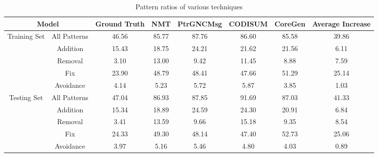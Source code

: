 \begin{table}[htbp]
\caption{Pattern ratios of various techniques}
\begin{tabular}{cc|cccccc}
\toprule
\multicolumn{2}{c|}{Model}&Ground Truth&NMT&PtrGNCMsg&CODISUM&CoreGen&Average Increase\\
\midrule
\multirow{5}{*}{Training Set}&All Patterns&46.56&85.77&87.76&86.60&85.58&39.86\\
~&Addition&15.43&18.75&24.21&21.62&21.56&6.11\\
~&Removal&3.10&13.00&9.42&11.45&8.88&7.59\\
~&Fix&23.90&48.79&48.41&47.66&51.29&25.14\\
~&Avoidance&4.14&5.23&5.72&5.87&3.85&1.03\\
\midrule
\multirow{5}{*}{Testing Set}&All Patterns&47.04&86.93&87.85&91.69&87.03&41.33\\
~&Addition&15.34&18.89&24.59&24.30&20.91&6.84\\
~&Removal&3.41&13.59&9.66&15.18&9.35&8.54\\
~&Fix&24.33&49.30&48.14&47.40&52.73&25.06\\
~&Avoidance&3.97&5.16&5.46&4.80&4.03&0.89\\
\bottomrule
\end{tabular}
\end{table}
